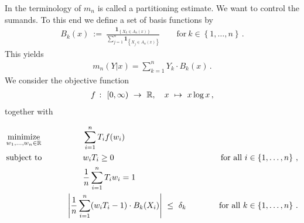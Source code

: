 In the terminology of \cite[§4]{Gyorfi2002}
$m_n$ is called a partitioning estimate.
We want to control the sumands.
To this end we define a set of basis functions by
\begin{gather}
  B_k(x)
  \ 
  :=
  \ 
  \frac
  {
    \mathbf{1}
    _
    {
      \left\{ 
      X_k \in A_n(x)
      \right\}
    }
  }
  {
    \sum_{j=1}^{n} 
    \mathbf{1}
    _
    {
      \left\{ 
      X_j \in A_n(x)
      \right\}
    }
  }
  \qquad
  \text{for}\ 
  k \in \left\{ 1,\ldots,n \right\}
  \,.
\end{gather}
This yields
\begin{gather}
  m_n(Y|x)
  =
  \sum_{k=1}^{n} 
  Y_k
  \cdot
  B_k(x)
  \,.
\end{gather}
We consider the objective function
\begin{gather}
  f
  \ 
  \colon
  \ 
  [0,\infty)
  \ 
  \to 
  \ 
  \R
  ,
  \quad
  x
  \ 
  \mapsto
  \ 
  x \log x\,,
\end{gather}
together with 
\begin{fproblem}
  \label{bw:1:primal}
\begin{align*}
    &\underset{w_1, \ldots, w_n \in \R}
    {\text{minimize}}
    &&\qquad\qquad
    \sum_{i = 1}^{n} 
    T_i
    f(w_i)
    &&&
    \\
    &\text{subject to}
    &&\qquad\qquad
    w_i T_i
    \ge
    0
    &&&
    \qquad
    \text{for all}\ 
    i \in \left\{ 1, \ldots, n \right\}
    \,,
    \\
    & 
    &&\qquad\qquad
    \frac{1}{n}
    \sum_{i=1}^{n} 
    T_i w_i
    =1
    \\
    & 
    &&\qquad
    \left| 
      \frac{1}{n} 
      \sum_{i = 1}^{n} 
      (
      w_i T_i 
      - 
      1
      )
      \cdot
      B_k(X_i)
    \right|
    \ 
    \le 
    \ 
    \delta_k
    &&&
    \qquad
    \text{for all}\ 
    k \in \left\{ 1, \ldots, n \right\}
    \,.
\end{align*}
\end{fproblem}
